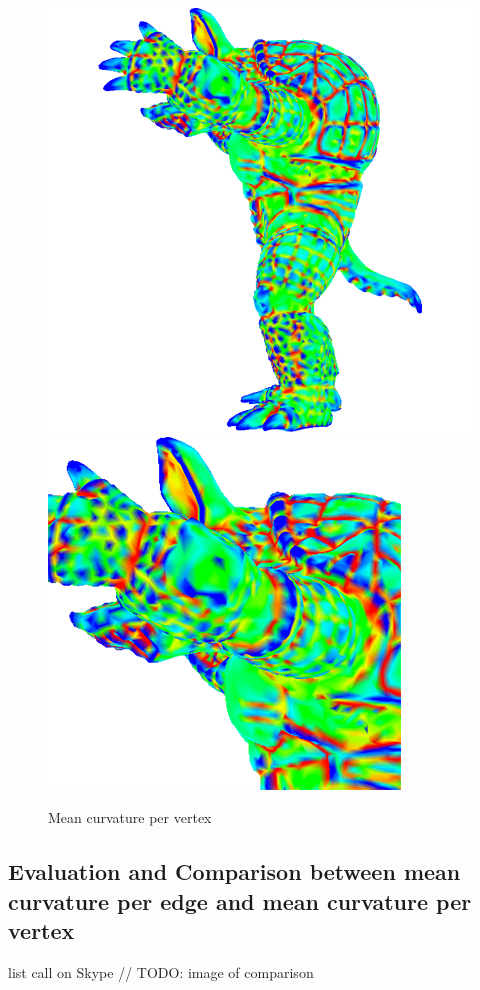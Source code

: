 \begin{figure}[!h]
    \centering
    \centering
    \includegraphics[scale=0.24]{images/mean-curvature-vertex.png}
    \endminipage\hfill
    \centering
    \includegraphics[scale=0.5]{images/mean-curvature-vertex-detail.png}
    \endminipage
    \caption{Mean curvature per vertex} \label{fig:armadillo-mean-vertex}
\end{figure}


\subsection{Evaluation and Comparison between mean curvature per edge and mean curvature per vertex}
list call on Skype
// TODO: image of comparison